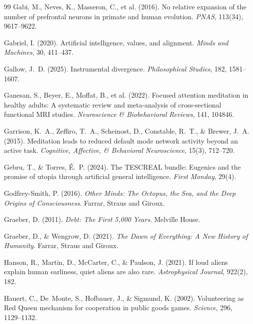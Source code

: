 \documentclass[11pt,a4paper,twocolumn]{article}
\begin{document}
\begin{thebibliography}{99}
 Gabi, M., Neves, K., Masseron, C., et al. (2016). No relative expansion of the number of prefrontal neurons in primate and human evolution. \textit{PNAS}, 113(34), 9617--9622.

 Gabriel, I. (2020). Artificial intelligence, values, and alignment. \textit{Minds and Machines}, 30, 411--437.

 Gallow, J.~D. (2025). Instrumental divergence. \textit{Philosophical Studies}, 182, 1581--1607.

 Ganesan, S., Beyer, E., Moffat, B., et al. (2022). Focused attention meditation in healthy adults: A systematic review and meta-analysis of cross-sectional functional MRI studies. \textit{Neuroscience \& Biobehavioral Reviews}, 141, 104846.

 Garrison, K.~A., Zeffiro, T.~A., Scheinost, D., Constable, R.~T., \& Brewer, J.~A. (2015). Meditation leads to reduced default mode network activity beyond an active task. \textit{Cognitive, Affective, \& Behavioral Neuroscience}, 15(3), 712--720.

 Gebru, T., \& Torres, \'E.~P. (2024). The TESCREAL bundle: Eugenics and the promise of utopia through artificial general intelligence. \textit{First Monday}, 29(4).

 Godfrey-Smith, P. (2016). \textit{Other Minds: The Octopus, the Sea, and the Deep Origins of Consciousness}. Farrar, Straus and Giroux.

 Graeber, D. (2011). \textit{Debt: The First 5,000 Years}. Melville House.

 Graeber, D., \& Wengrow, D. (2021). \textit{The Dawn of Everything: A New History of Humanity}. Farrar, Straus and Giroux.

 Hanson, R., Martin, D., McCarter, C., \& Paulson, J. (2021). If loud aliens explain human earliness, quiet aliens are also rare. \textit{Astrophysical Journal}, 922(2), 182.

 Hauert, C., De~Monte, S., Hofbauer, J., \& Sigmund, K. (2002). Volunteering as Red Queen mechanism for cooperation in public goods games. \textit{Science}, 296, 1129--1132.


\end{thebibliography}
\end{document}
